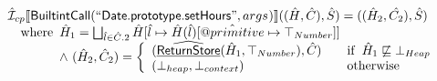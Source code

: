 \documentclass{article}
\makeatletter
\newcommand{\SF}[1]{\mbox{\textsf{#1}}}
\newcommand{\wherec}[1]{{\rm where}\begin{array}[t]{l}#1\end{array}}
\newcommand{\ifc}[1]{{\rm if}\begin{array}[t]{l}#1\end{array}}
\newcommand{\owc}{{\rm otherwise}}
\newcommand{\aI}{\hat{\mathcal{I}}}
\newcommand{\lbr}{\llbracket}
\newcommand{\rbr}{\rrbracket}
\newcommand{\ahf}[1]{\widehat{\underline{\sf #1}}}
\newcommand{\avarprop}[1]{\hat{@#1}}
\makeatother
\begin{document}
\[\begin{array}{l}
\aI _{cp}\lbr \SF{BuiltintCall}(``\SF{Date.prototype.setHours}",args_{})\rbr((\hat{H},\hat{C}), \hat{S})
  = ((\hat{H}_2, \hat{C_2}), \hat{S})\\
\quad\wherec{
  \hat{H}_1 = \bigsqcup_{\hat{l} \in \hat{C}.2} \hat{H}[\hat{l}
    \mapsto \hat{H}(\hat{l})[\avarprop{primitive} \mapsto \top_{Number}]]\\
  \land\ (\hat{H}_2, \hat{C}_2) = 
    \left\{\begin{array}{l@{\quad\quad}l}
      (\ahf{ReturnStore}(\hat{H}_1, \top_{Number}), \hat{C})
      & \ifc{\hat{H}_1 \not\sqsubseteq \bot_{Heap}}\\
      (\bot_{heap}, \bot_{context}) & \owc \\
    \end{array}\right.\\
  }\\
\\\\

\end{array}
\]
\end{document}
